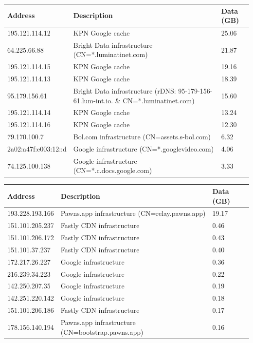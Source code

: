 \begin{tabular}{lll}
\toprule
Address & Description & Data (GB) \\
\midrule
195.121.114.12 & KPN Google cache & 25.06 \\
64.225.66.88 & Bright Data infrastructure (CN=*.luminatinet.com) & 21.87 \\
195.121.114.15 & KPN Google cache & 19.16 \\
195.121.114.13 & KPN Google cache & 18.39 \\
95.179.156.61 & Bright Data infrastructure (rDNS: 95-179-156-61.lum-int.io. \& CN=*.luminatinet.com) & 15.60 \\
195.121.114.14 & KPN Google cache & 13.24 \\
195.121.114.16 & KPN Google cache & 12.30 \\
79.170.100.7 & Bol.com infrastructure (CN=assets.s-bol.com) & 6.32 \\
2a02:a47f:e003:12::d & Google infrastructure (CN=*.googlevideo.com) & 4.06 \\
74.125.100.138 & Google infrastructure (CN=*.c.docs.google.com) & 3.33 \\
\bottomrule
\end{tabular}

\begin{tabular}{lll}
\toprule
Address & Description & Data (GB) \\
\midrule
193.228.193.166 & Pawns.app infrastructure (CN=relay.pawns.app) & 19.17 \\
151.101.205.237 & Fastly CDN infrastructure & 0.46 \\
151.101.206.172 & Fastly CDN infrastructure & 0.43 \\
151.101.37.237 & Fastly CDN infrastructure & 0.40 \\
172.217.26.227 & Google infrastructure & 0.36 \\
216.239.34.223 & Google infrastructure & 0.22 \\
142.250.207.35 & Google infrastructure & 0.19 \\
142.251.220.142 & Google infrastructure & 0.18 \\
151.101.206.186 & Fastly CDN infrastructure & 0.17 \\
178.156.140.194 & Pawns.app infrastructure (CN=bootstrap.pawns.app) & 0.16 \\
\bottomrule
\end{tabular}

